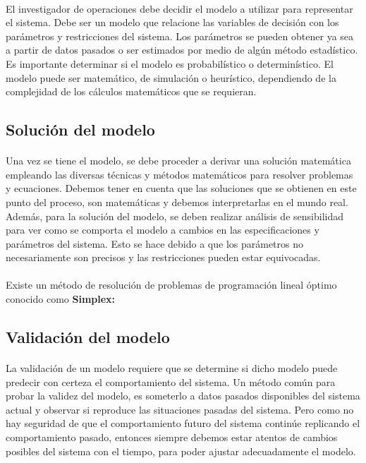 \documentclass[12pt, a4paper,spanish]{article}
\begin{document}
			\paragraph{}
			El investigador de operaciones debe decidir el modelo a utilizar para representar el sistema. Debe ser un modelo que relacione las variables de decisión con los parámetros y restricciones del sistema. Los parámetros se pueden obtener ya sea a partir de datos pasados o ser estimados por medio de algún método estadístico. Es importante determinar si el modelo es probabilístico o determinístico. El modelo puede ser matemático, de simulación o heurístico, dependiendo de la complejidad de los cálculos matemáticos que se requieran. \cite{invdeop_IO}

		\subsection{Solución del modelo}

			\paragraph{}
			Una vez se tiene el modelo, se debe proceder a derivar una solución matemática empleando las diversas técnicas y métodos matemáticos para resolver problemas y ecuaciones. Debemos tener en cuenta que las soluciones que se obtienen en este punto del proceso, son matemáticas y debemos interpretarlas en el mundo real. Además, para la solución del modelo, se deben realizar análisis de sensibilidad para ver como se comporta el modelo a cambios en las especificaciones y parámetros del sistema. Esto se hace debido a que los parámetros no necesariamente son precisos y las restricciones pueden estar equivocadas. \cite{invdeop_IO}

			\paragraph{}
			Existe un método de resolución de problemas de programación lineal óptimo conocido como \textbf{Simplex:}
			

		\subsection{Validación del modelo}

			\paragraph{}
			La validación de un modelo requiere que se determine si dicho modelo puede predecir con certeza el comportamiento del sistema. Un método común para probar la validez del modelo, es someterlo a datos pasados disponibles del sistema actual y observar si reproduce las situaciones pasadas del sistema. Pero como no hay seguridad de que el comportamiento futuro del sistema continúe replicando el comportamiento pasado, entonces siempre debemos estar atentos de cambios posibles del sistema con el tiempo, para poder ajustar adecuadamente el modelo.\cite{invdeop_IO}
\end{document}

